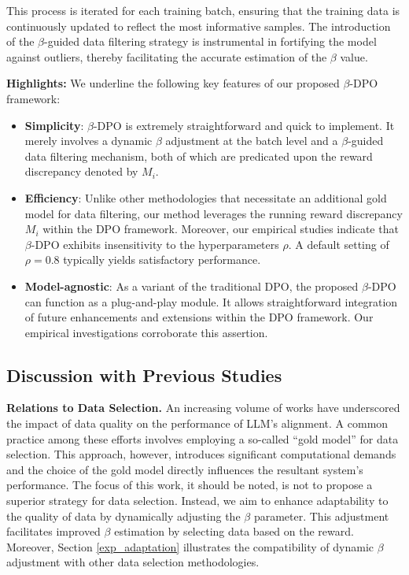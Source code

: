 This process is iterated for each training batch, ensuring that the training data is continuously updated to reflect the most informative samples. The introduction of the $\beta$-guided data filtering strategy is instrumental in fortifying the model against outliers, thereby facilitating the accurate estimation of the $\beta$ value.

\textbf{Highlights:}
We underline the following key features of our proposed $\beta$-DPO framework:
\begin{itemize}[leftmargin=*]
    \item \textbf{Simplicity}: $\beta$-DPO is extremely straightforward and quick to implement. It merely involves a dynamic $\beta$ adjustment at the batch level and a $\beta$-guided data filtering mechanism, both of which are predicated upon the reward discrepancy denoted by $M_i$.
    \item \textbf{Efficiency}: Unlike other methodologies \cite{RSO,morimura2024filtered,pruthi2020estimating,f-dpo} that necessitate an additional gold model for data filtering, our method leverages the running reward discrepancy $M_i$ within the DPO framework. Moreover, our empirical studies indicate that $\beta$-DPO exhibits insensitivity to the hyperparameters $\rho$. A default setting of $\rho=0.8$ typically yields satisfactory performance.
    \item \textbf{Model-agnostic}: As a variant of the traditional DPO, the proposed $\beta$-DPO can function as a plug-and-play module. It allows straightforward integration of future enhancements and extensions within the DPO framework. Our empirical investigations corroborate this assertion.
\end{itemize}

\subsection{Discussion with Previous Studies}
\textbf{Relations to Data Selection.} An increasing volume of works \cite{RSO,morimura2024filtered,LIMA,pruthi2020estimating, xia2024less} have underscored the impact of data quality on the performance of LLM's alignment. A common practice among these efforts involves employing a so-called ``gold model'' for data selection. This approach, however, introduces significant computational demands and the choice of the gold model directly influences the resultant system's performance. The focus of this work, it should be noted, is not to propose a superior strategy for data selection. Instead, we aim to enhance adaptability to the quality of data by dynamically adjusting the $\beta$ parameter. This adjustment facilitates improved $\beta$ estimation by selecting data based on the reward. Moreover, Section \ref{exp_adaptation} illustrates the compatibility of dynamic $\beta$ adjustment with other data selection methodologies.

